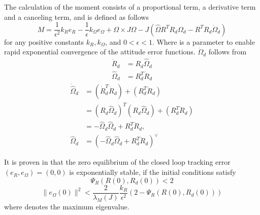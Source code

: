 
The calculation of the moment consists of a proportional term, a derivative term and a canceling term, and is defined as follows \cite{Lee2010}
\begin{equation}\label{eq:con.M}
M = \frac{1}{\epsilon^2}k_Re_R-\frac{1}{\epsilon}k_\Omega e_\Omega+\Omega\times J\Omega-J(\hat{\Omega}R^TR_d\Omega_d-R^TR_d\dot{\Omega}_d)
\end{equation}
for any positive constants $ k_R, k_\Omega $, and $ 0<\epsilon<1 $. Where  is a parameter to enable rapid exponential convergence of the attitude error functions. $ \dot{\Omega}_d $ follows from 
\begin{equation}\label{key}
\begin{aligned}
\dot{R}_d&=R_d\hat{\Omega}_d\\
\hat{\Omega}_d&=R_d^T\dot{R}_d
\end{aligned}
\end{equation}
\begin{equation}\label{key}
\begin{aligned}
\dot{\hat{\Omega}}_d&=(\dot{R}_d^T\dot{R}_d)+(R_d^T\ddot{R}_d)\\
&=(R_d\hat{\Omega}_d)^T(R_d\hat{\Omega}_d)+(R_d^T\ddot{R}_d)\\
&=-\hat{\Omega}_d\hat{\Omega}_d+R_d^T\ddot{R}_d,\\
\hat{\Omega}_d&=(-\hat{\Omega}_d\hat{\Omega}_d+R_d^T\ddot{R}_d)^\vee
\end{aligned}
\end{equation}

It is proven in \cite{Lee2010} that the zero equilibrium of the closed loop tracking error $ (e_R,e_\Omega)=(0,0) $ is exponentially stable, if the initial conditions satisfy
\begin{equation}\label{eq:dom1}
\Psi_R(R(0),R_d(0))<2
\end{equation}
\begin{equation}\label{eq:dom2}
\parallel e_\Omega(0)\parallel^2<\frac{2}{\lambda_M(J)}\frac{k_R}{\epsilon^2}(2-\Psi_R(R(0),R_d(0)))
\end{equation}
where  denotes the maximum eigenvalue.


